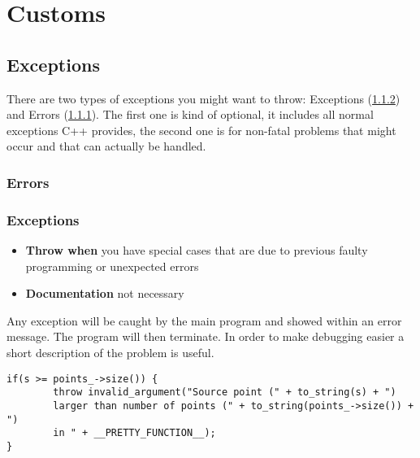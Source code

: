 
\chapter{Customs}

\section{Exceptions}
\label{sec:Exceptions}

There are two types of exceptions you might want to throw: Exceptions (\ref{subsec:Exceptions}) and Errors (\ref{subsec:Errors}). The first one is kind of optional, it includes all normal exceptions C++ provides, the second one is for non-fatal problems that might occur and that can actually be handled.

\subsection{Errors}
\label{subsec:Errors}


\subsection{Exceptions}
\label{subsec:Exceptions}

\begin{itemize}
	\item \textbf{Throw when} you have special cases that are due to previous faulty programming or unexpected errors
	\item \textbf{Documentation} not necessary
\end{itemize}

Any exception will be caught by the main program and showed within an error message. The program will then terminate. In order to make debugging easier a short description of the problem is useful.

\begin{lstlisting}[style=lstStyleCpp]
if(s >= points_->size()) {
        throw invalid_argument("Source point (" + to_string(s) + ") 
        larger than number of points (" + to_string(points_->size()) + ") 
        in " + __PRETTY_FUNCTION__);
}
\end{lstlisting}